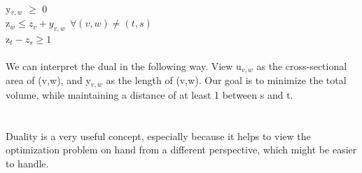 \documentclass[11pt]{article}
\begin{document}
\\
y$_{v,w}$ $\geq$ 0 \\
z$_{w} \leq z_{v} + y_{v,w} \ \ \forall (v,w) \neq (t,s)$\\
z$_{t} - z_{s} \geq 1$ 
\\
\\
We can interpret the dual in the following way. View u$_{v,w}$ as the cross-sectional area of (v,w), and y$_{v,w}$ as the length of (v,w). Our goal is to minimize the total volume, while maintaining a distance of at least 1 between s and t.  
\\
\\
\\
Duality is a very useful concept, especially because it helps to view the optimization problem on hand from a different perspective, which might be easier to handle.
\end{document}
